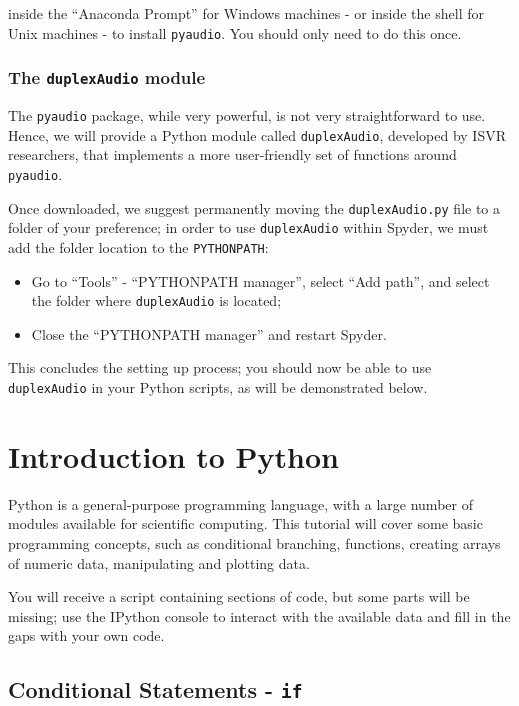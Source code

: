 inside the ``Anaconda Prompt'' for Windows machines - or inside the shell for Unix machines - to install {\tt pyaudio}. You should only need to do this once.

\subsubsection{The {\tt duplexAudio} module}

The {\tt pyaudio} package, while very powerful, is not very straightforward to use. Hence, we will provide a Python module called {\tt duplexAudio}, developed by ISVR researchers, that implements a more user-friendly set of functions around {\tt pyaudio}.

Once downloaded, we suggest permanently moving the {\tt duplexAudio.py} file to a folder of your preference; in order to use {\tt duplexAudio} within Spyder, we must add the folder location to the {\tt PYTHONPATH}:

\begin{itemize}
	\item Go to ``Tools'' - ``PYTHONPATH manager'', select ``Add path'', and select the folder where {\tt duplexAudio} is located;
	\item Close the ``PYTHONPATH manager'' and restart Spyder.
\end{itemize}

This concludes the setting up process; you should now be able to use {\tt duplexAudio} in your Python scripts, as will be demonstrated below.

\section{Introduction to Python}

Python is a general-purpose programming language, with a large number of modules available for scientific computing. This tutorial will cover some basic programming concepts, such as conditional branching, functions, creating arrays of numeric data, manipulating and plotting data.

You will receive a script containing sections of code, but some parts will be missing; use the IPython console to interact with the available data and fill in the gaps with your own code.

\subsection{Conditional Statements - {\tt if}}

